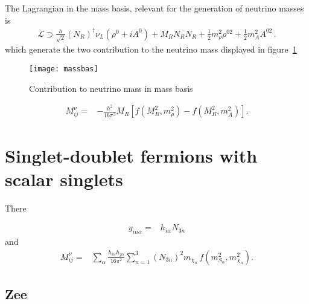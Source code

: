 The Lagrangian in the mass basis, relevant for the generation of neutrino masses is
\begin{align}
  \mathcal{L}\supset \frac{h}{\sqrt{2}} \left( N_R \right)^{\dagger} \nu_L \left( \rho^0+i A^0  \right)
  + M_R N_R N_R + \frac{1}{2}m_{\rho}^2 \rho^{02}+ \frac{1}{2}m_{A}^2 A^{02}\,.
\end{align}
which generate the two contribution to the neutrino mass displayed in figure~\ref{fig:massbas}

\begin{figure}
  \centering
  \texttt{[image: massbas]}
  \caption{Contribution to neutrino mass in mass basis}
  \label{fig:massbas}
\end{figure}

\begin{align}
 M^{\nu}_{ij}=&-\frac{h^2}{16\pi^2}M_R \left[ 
f \left( M_R^2,m_{\rho}^2 \right)-f \left( M_R^2,m_{A}^2 \right) \right].
\end{align}

\section{Singlet-doublet fermions with scalar singlets}
There~\cite{Restrepo:2015ura}

\begin{align}
  y_{i n\alpha}=&h_{i\alpha}N_{3n} 
\end{align}
and 
\begin{align}
   M^{\nu}_{ij}=&\sum_{\alpha}\frac{h_{i\alpha}h_{j\alpha}}{16\pi^2}\sum_{n=1}^3 \left( N_{3n} \right)^2m_{\chi_n}
\,f\left( m_{S_\alpha}^2,m_{\chi_n}^2 \right).
\end{align}

\subsection{Zee}

